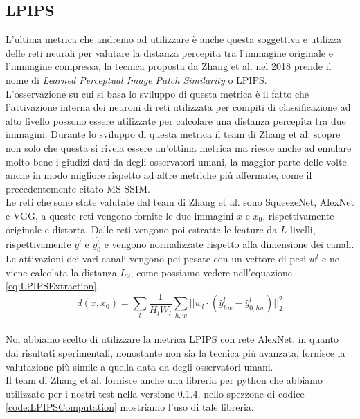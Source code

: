 \subsection{LPIPS}
L’ultima metrica che andremo ad utilizzare è anche questa soggettiva e utilizza delle reti neurali per valutare la distanza percepita tra l’immagine originale e l’immagine compressa, la tecnica proposta da Zhang et al. nel 2018 \cite{zhang2018unreasonable} prende il nome di \textit{Learned Perceptual Image Patch Similarity} o LPIPS.\\
L’osservazione su cui si basa lo sviluppo di questa metrica è il fatto che l’attivazione interna dei neuroni di reti utilizzata per compiti di classificazione ad alto livello possono essere utilizzate per calcolare una distanza percepita tra due immagini. Durante lo sviluppo di questa metrica il team di Zhang et al. scopre non solo che questa si rivela essere un’ottima metrica ma riesce anche ad emulare molto bene i giudizi dati da degli osservatori umani, la maggior parte delle volte anche in modo migliore rispetto ad altre metriche più affermate, come il precedentemente citato MS-SSIM.\\
Le reti che sono state valutate dal team di Zhang et al. sono SqueezeNet, AlexNet e VGG, a queste reti vengono fornite le due immagini $x$ e $x_{0}$, rispettivamente originale e distorta. Dalle reti vengono poi estratte le feature da $L$ livelli, rispettivamente $\hat{y^l}$ e $\hat{y_{0}^l}$ e vengono normalizzate rispetto alla dimensione dei canali. Le attivazioni dei vari canali vengono poi pesate con un vettore di pesi $w^l$ e ne viene calcolata la distanza $L_{2}$, come possiamo vedere nell’equazione \ref{eq:LPIPSExtraction}.\\
\begin{equation}\label{eq:LPIPSExtraction}
    d(x,x_{0}) = \sum_{l}\dfrac{1}{H_{l}W_{l}} \sum_{h,w} || w_{l} \cdot (\hat{y}_{hw}^{l} - \hat{y}_{0,hw}^{l}) ||_{2}^{2}
\end{equation}\\
Noi abbiamo scelto di utilizzare la metrica LPIPS con rete AlexNet, in quanto dai risultati sperimentali, nonostante non sia la tecnica più avanzata, fornisce la valutazione più simile a quella data da degli osservatori umani.\\
Il team di Zhang et al. fornisce anche una libreria per python che abbiamo utilizzato per i nostri test nella versione 0.1.4, nello spezzone di codice \ref{code:LPIPSComputation} mostriamo l'uso di tale libreria.\\
